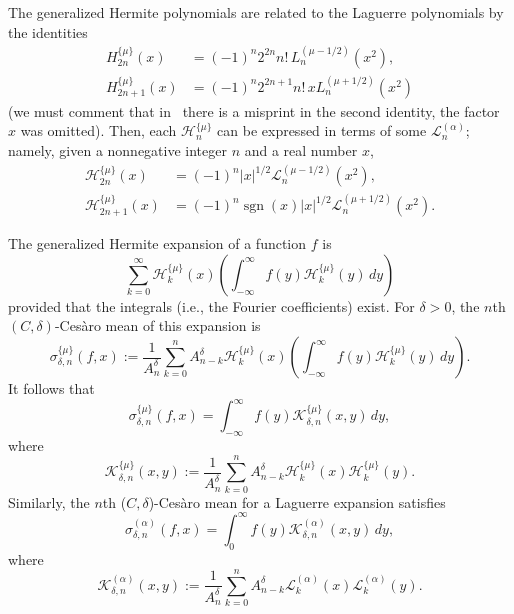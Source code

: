 \documentclass{amsart}
\theoremstyle{plain}
\theoremstyle{definition}
\theoremstyle{remark}
\newcommand{\cheker}[5]{\mathcal{K}_{#1,#2}^{\{#3\}}%
  (#4,#5)} %
\newcommand{\chem}[3]{\sigma_{#1,#2}^{\{#3\}}} %
\newcommand{\claker}[5]{\mathcal{K}_{#1,#2}^{(#3)}%
  (#4,#5)} %
\newcommand{\clam}[3]{\sigma_{#1,#2}^{(#3)}} %
\newcommand{\herfun}[2]{\mathcal{H}_{#1}^{\{#2\}}}
\newcommand{\herpol}[2]{H_{#1}^{\{#2\}}}
\newcommand{\lagfun}[2]{\mathcal{L}_{#1}^{(#2)}}
\newcommand{\lagpol}[2]{L_{#1}^{(#2)}}
\newcommand{\combi}[2]{A_{#1}^{#2}}
\newcommand{\I}{\infty}
\newcommand{\sgn}{\operatorname{sgn}}
\begin{document}
The generalized Hermite polynomials are related to the Laguerre polynomials by the identities
\begin{align*}
\herpol{2n}{\mu}(x) &= (-1)^n 2^{2n}n!\,\lagpol{n}{\mu-1/2}(x^2),\\
\herpol{2n+1}{\mu}(x) &= (-1)^n 2^{2n+1}n!\,x\lagpol{n}{\mu+1/2}(x^2)
\end{align*}
(we must comment that in~\cite[Ch.~V, \S\,2 (G), p.~156]{Ch} there is a misprint in the second identity, the factor $x$ was omitted).
Then, each $\herfun{n}{\mu}$ can be expressed in terms of some
$\lagfun{n}{\alpha}$; namely, given a nonnegative integer $n$ and a real number $x$,
\begin{equation}
\label{h-lid}
\begin{aligned}
  \herfun{2n}{\mu}(x) &= (-1)^{n}|x|^{1/2}
    \lagfun{n}{\mu-1/2}(x^{2}),\\
  \herfun{2n + 1}{\mu}(x) &= (-1)^{n}\sgn(x)|x|^{1/2}
    \lagfun{n}{\mu+1/2}(x^{2}).
\end{aligned}
\end{equation}

The generalized Hermite expansion of a function $f$ is
\[
  \sum_{k=0}^\infty\herfun{k}{\mu}(x)
  \left(\int_{-\I}^\I f(y)\herfun{k}{\mu}(y)\,dy\right)
\]
provided that the integrals (i.e., the Fourier coefficients) exist.
For $\delta>0$, the $n$th $(C,\delta)$-Ces\`aro
mean of this expansion is
\[
  \chem{\delta}{n}{\mu}(f,x)
  := \frac{1}{\combi{n}{\delta}} \sum_{k=0}^n\combi{n-k}{\delta}
  \herfun{k}{\mu}(x) \left(\int_{-\I}^\I f(y)\herfun{k}{\mu}(y)\,dy\right).
\]
It follows that
\begin{equation*}
  \chem{\delta}{n}{\mu}(f,x) = \int_{-\I}^{\I}f(y)
    \cheker{\delta}{n}{\mu}{x}{y}\,dy,
\end{equation*}
where
\begin{equation*}
  \cheker{\delta}{n}{\mu}{x}{y}
  := \frac{1}{\combi{n}{\delta}} \sum_{k = 0}^{n}
  \combi{n-k}{\delta} \herfun{k}{\mu}(x)\herfun{k}{\mu}(y).
\end{equation*}
Similarly, the $n$th ($C,\delta$)-Ces\`aro mean for a Laguerre expansion satisfies
\begin{equation*}
  \clam{\delta}{n}{\alpha}(f,x)
  = \int_{0}^{\I}f(y) \claker{\delta}{n}{\alpha}{x}{y}\,dy,
\end{equation*}
where
\begin{equation*}
  \claker{\delta}{n}{\alpha}{x}{y}
  := \frac{1}{\combi{n}{\delta}} \sum_{k = 0}^{n}
  \combi{n-k}{\delta} \lagfun{k}{\alpha}(x)\lagfun{k}{\alpha}(y).
\end{equation*}
\end{document}
